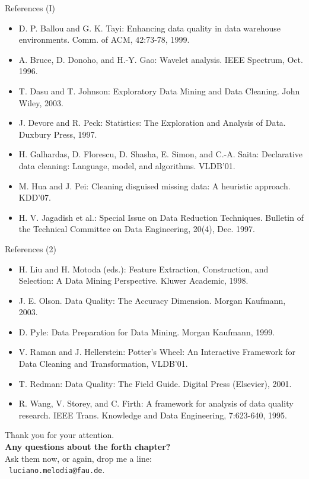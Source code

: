 \documentclass[aspectratio=169,t]{beamer}
\begin{document}
  {
    \begin{frame}{References (I)}
      \begin{itemize}
        \item D. P. Ballou and G. K. Tayi: Enhancing data quality in data warehouse environments. Comm. of ACM, 42:73-78, 1999.
        \item A. Bruce, D. Donoho, and H.-Y. Gao: Wavelet analysis. IEEE Spectrum, Oct. 1996.
        \item {\color{airforceblue}T. Dasu and T. Johnson:  Exploratory Data Mining and Data Cleaning. John Wiley, 2003.}
        \item J. Devore and R. Peck: Statistics: The Exploration and Analysis of Data. Duxbury Press, 1997.
        \item H. Galhardas, D. Florescu, D. Shasha, E. Simon, and C.-A. Saita: Declarative data cleaning: Language, model, and algorithms. VLDB'01.
        \item M. Hua and J. Pei: Cleaning disguised missing data: A heuristic approach. KDD'07.
        \item {\color{airforceblue}H. V. Jagadish et al.: Special Issue on Data Reduction Techniques.  Bulletin of the Technical Committee on Data Engineering, 20(4), Dec. 1997.}
      \end{itemize}
    \end{frame}
  }


  {
    \begin{frame}{References (2)}
      \begin{itemize}
        \item H. Liu and H. Motoda (eds.): Feature Extraction, Construction, and Selection: A Data Mining Perspective. Kluwer Academic, 1998.
        \item J. E. Olson. Data Quality: The Accuracy Dimension. Morgan Kaufmann, 2003.
        \item D. Pyle: Data Preparation for Data Mining. Morgan Kaufmann, 1999.
        \item {\color{airforceblue}V. Raman and J. Hellerstein: Potter's Wheel: An Interactive Framework for Data Cleaning and Transformation, VLDB'01.}
        \item T. Redman: Data Quality: The Field Guide. Digital Press (Elsevier), 2001.
        \item R. Wang, V. Storey, and C. Firth: A framework for analysis of data quality research. IEEE Trans. Knowledge and Data Engineering, 7:623-640, 1995.
      \end{itemize}
    \end{frame}
  }

  { %
    \begin{frame}[c]
      \begin{center}
        Thank you for your attention.\\
        {\bf Any questions about the forth chapter?}\\[0.5cm]
        Ask them now, or again, drop me a line: \\ 
        \faSendO \ \texttt{luciano.melodia@fau.de}.
      \end{center}
    \end{frame}
  }
\end{document}
